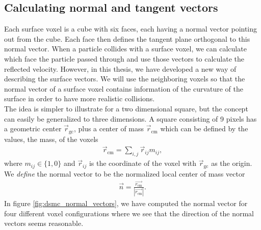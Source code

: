 \subsection{Calculating normal and tangent vectors}
Each surface voxel is a cube with six faces, each having a normal vector pointing out from the cube. Each face then defines the tangent plane orthogonal to this normal vector. When a particle collides with a surface voxel, we can calculate which face the particle passed through and use those vectors to calculate the reflected velocity. However, in this thesis, we have developed a new way of describing the surface vectors. We will use the neighboring voxels so that the normal vector of a surface voxel contains information of the curvature of the surface in order to have more realistic collisions.\\
The idea is simpler to illustrate for a two dimensional square, but the concept can easily be generalized to three dimensions. A square consisting of 9 pixels has a geometric center $\vec r_\text{gc}$, plus a center of mass $\vec r_\text{cm}$ which can be defined by the values, the mass, of the voxels
\begin{align}
	\vec r_\text{cm} = \sum_{i,j} \vec r_{ij}m_{ij},
\end{align}
where $m_{ij} \in \{1,0\}$ and $\vec r_{ij}$ is the coordinate of the voxel with $\vec r_\text{gc}$ as the origin. We \textit{define} the normal vector to be the normalized local center of mass vector
\begin{align}
	\label{eq:dsmc_normal_vector}
	\vec n = \frac{\vec{r_\text{cm}}}{|\vec{r_\text{cm}}|}.
\end{align}
In figure \ref{fig:dsmc_normal_vectors}, we have computed the normal vector for four different voxel configurations where we see that the direction of the normal vectors seems reasonable. 
